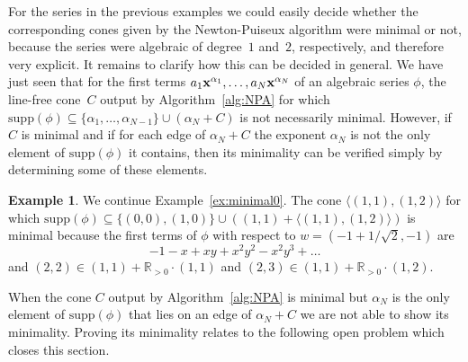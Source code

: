 \documentclass[a4paper,draft]{amsart}
\newtheorem{Conjecture}{Conjecture}
\theoremstyle{definition}
\newtheorem{Example}{Example}
\begin{document}
For the series in the previous examples we could easily decide whether the corresponding cones given by the Newton-Puiseux algorithm were minimal or not, because the series were algebraic of degree~$1$ and~$2$, respectively, and therefore very explicit. It remains to clarify how this can be decided in general. We have just seen that for the first terms $a_1 \bold{x}^{\alpha_1},\dots, a_N \bold{x}^{\alpha_N}$ of an algebraic series $\phi$, the line-free cone~$C$ output by Algorithm~\ref{alg:NPA} for which $\mathrm{supp}(\phi) \subseteq \{\alpha_1,\dots,\alpha_{N-1}\}\cup (\alpha_N+C)$ is not necessarily minimal. However, if $C$ is minimal and if for each edge of $\alpha_N+C$ the exponent $\alpha_N$ is not the only element of $\mathrm{supp}(\phi)$ it contains, then its minimality can be verified simply by determining some of these elements.

\begin{Example}\label{ex:minimal1}
We continue Example~\ref{ex:minimal0}. The cone $\langle (1,1), (1,2) \rangle$ for which $\mathrm{supp}(\phi)\subseteq \{(0,0), (1,0)\}\cup ((1,1)+ \langle (1,1), (1,2) \rangle)$ is minimal because the first terms of $\phi$ with respect to $w = (-1+1/\sqrt{2},-1)$ are
\begin{equation*}
-1 - x + x y + x^2 y^2 - x^2 y^3 +\dots 
\end{equation*}
and $(2,2)\in(1,1)+\mathbb{R}_{>0} \cdot (1,1)$ and $(2,3) \in(1,1) + \mathbb{R}_{>0} \cdot (1,2)$. 
\end{Example}


When the cone $C$ output by Algorithm~\ref{alg:NPA} is minimal but $\alpha_N$ is the only element of $\mathrm{supp}(\phi)$ that lies on an edge of $\alpha_N + C$ we are not able to show its minimality. Proving its minimality relates to the following open problem which closes this section.
\end{document}
